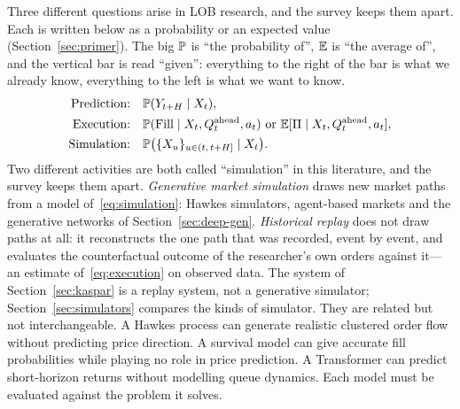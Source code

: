 Three different questions arise in LOB research, and the survey keeps them apart. Each is written below as a
probability or an expected value (Section~\ref{sec:primer}). The big $\P$ is ``the probability
of'', $\E$ is ``the average of'', and the vertical bar is read ``given'': everything to the right of
the bar is what we already know, everything to the left is what we want to know.
\begin{align}
  \text{Prediction:} &\quad \P(Y_{t+H} \mid X_t), \label{eq:prediction}\\
  \text{Execution:}  &\quad \P(\Fill \mid X_t, Q^{\text{ahead}}_t, a_t)
                        \ \text{or}\ \E[\Pi \mid X_t, Q^{\text{ahead}}_t, a_t], \label{eq:execution}\\
  \text{Simulation:} &\quad \P\big(\{X_u\}_{u \in (t,\,t+H]} \mid X_t\big). \label{eq:simulation}
\end{align}
Two different activities are both called ``simulation'' in this literature, and the survey keeps them
apart. \emph{Generative market simulation} draws new market paths from a model of~\eqref{eq:simulation}: Hawkes
simulators, agent-based markets and the generative networks of Section~\ref{sec:deep-gen}.
\emph{Historical replay} does not draw paths at all: it reconstructs the one path that was recorded,
event by event, and evaluates the counterfactual outcome of the researcher's own orders against it---an
estimate of~\eqref{eq:execution} on observed data. The \kasparhft{} system of Section~\ref{sec:kaspar} is a replay system, not a generative
simulator; Section~\ref{sec:simulators} compares the kinds of simulator.
They are related but not interchangeable. A Hawkes process can generate realistic clustered order
flow without predicting price direction. A survival model can give accurate fill probabilities
while playing no role in price prediction. A Transformer can predict short-horizon returns without
modelling queue dynamics. Each model must be evaluated against the problem it solves.

